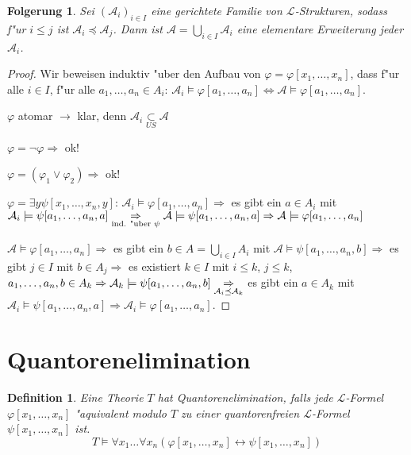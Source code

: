 \documentclass[a4paper,12pt,numbers=noenddot,parskip=full]{scrartcl}
\newcommand{\scrL}{\mathcal{L}}
\newcommand{\scrA}{\mathcal{A}}
\theoremstyle{dotless}
\newtheorem{corollary}[theorem]{Folgerung}
\newtheorem{definition}[theorem]{Definition}
\begin{document}
\begin{corollary}
	Sei $(\scrA_i)_{i \in I}$ eine gerichtete Familie von $\scrL$-Strukturen, sodass f"ur $i \leq j$ ist $\scrA_i \preceq \scrA_j$. Dann ist $\scrA = \underset{i \in I}{\bigcup} \scrA_i$ eine elementare Erweiterung jeder $\scrA_i$.
\end{corollary}
\begin{proof}
	Wir beweisen induktiv "uber den Aufbau von $\varphi=\varphi[x_1, \dots, x_n]$, dass f"ur alle $i \in I$, f"ur alle $a_1, \dots, a_n \in A_i$: $\scrA_i \models \varphi[a_1, \dots, a_n] \Leftrightarrow \scrA \models \varphi[a_1, \dots, a_n]$.
	
	$\varphi$ atomar $\rightarrow$ klar, denn $\scrA_i \underset{US}{\subset} \scrA$
	
	$\varphi = \lnot \varphi \Rightarrow$ ok!
	
	$\varphi = (\varphi_1 \lor \varphi_2) \Rightarrow$ ok!
	
	$\varphi = \exists y \psi[x_1, \dots, x_n, y]$: $\scrA_i\models \varphi[a_1, \dots, a_n] \Rightarrow$ es gibt ein $a \in A_i$ mit $\scrA_i\models \psi[a_1, \dots,a_n, a] \\
	\underset{\text{ind. "uber }\psi}{\Rightarrow} \scrA \models \psi[a_1, \dots, a_n, a] \Rightarrow \scrA \models \varphi[a_1, \dots, a_n]$
	
	$\scrA \models \varphi[a_1, \dots, a_n] \Rightarrow$ es gibt ein $b \in A = \underset{i \in I}{\bigcup} A_i$ mit $\scrA \models \psi[a_1, \dots, a_n, b] \Rightarrow$ es gibt $j \in I$ mit $b \in A_j \Rightarrow$ es existiert $k \in I$ mit $i \leq k$, $j \leq k$, $a_1, \dots, a_n, b \in A_k \\
	\Rightarrow \scrA_k \models \psi[a_1, \dots, a_n, b] \underset{\scrA_i \preceq \scrA_k}{\Rightarrow}$ es gibt ein $a \in A_k$ mit $\scrA_i \models \psi[a_1, \dots, a_n, a] \Rightarrow {\scrA_i \models \varphi[a_1, \dots, a_n]}$.
\end{proof}

\section{Quantorenelimination}
\begin{definition}
	Eine Theorie $T$ hat Quantorenelimination, falls jede $\scrL$-Formel $\varphi[x_1, \dots, x_n]$ "aquivalent modulo $T$ zu einer quantorenfreien $\scrL$-Formel $\psi[x_1, \dots, x_n]$ ist.
	\begin{equation*}
		T \models \forall x_1 \dots \forall x_n (\varphi[x_1, \dots, x_n] \leftrightarrow \psi[x_1, \dots, x_n])
	\end{equation*}
\end{definition}
\end{document}
